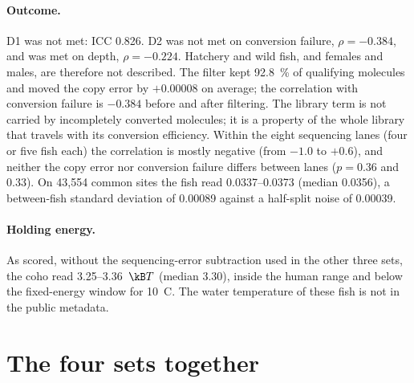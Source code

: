 \paragraph{Outcome.} D1 was not met: ICC 0.826. D2 was not met on conversion failure, $\rho=-0.384$, and was met on depth,
$\rho=-0.224$. Hatchery and wild fish, and females and males, are therefore not described. The filter kept 92.8~\% of qualifying
molecules and moved the copy error by $+0.00008$ on average; the correlation with conversion failure is $-0.384$ before and after
filtering. The library term is not carried by incompletely converted molecules; it is a property of the whole library that travels
with its conversion efficiency. Within the eight sequencing lanes (four or five fish each) the correlation is mostly negative
(from $-1.0$ to $+0.6$), and neither the copy error nor conversion failure differs between lanes ($p=0.36$ and $0.33$). On 43,554
common sites the fish read 0.0337--0.0373 (median 0.0356), a between-fish standard deviation of 0.00089 against a half-split
noise of 0.00039. \measured

\paragraph{Holding energy.} As scored, without the sequencing-error subtraction used in the other three sets, the coho read
3.25--3.36~$\kB T$ (median 3.30), inside the human range and below the fixed-energy window for 10~\textdegree C. \measured{} The water
temperature of these fish is not in the public metadata.

\section{The four sets together}

